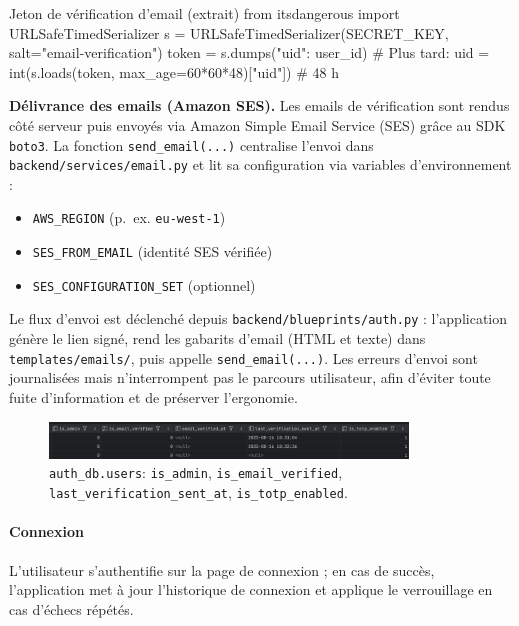 \begin{codebox}[language=Python]{Jeton de vérification d'email (extrait)}
from itsdangerous import URLSafeTimedSerializer
s = URLSafeTimedSerializer(SECRET_KEY, salt="email-verification")
token = s.dumps({"uid": user_id})
# Plus tard:  uid = int(s.loads(token, max_age=60*60*48)["uid"])  # 48 h
\end{codebox}

\noindent\textbf{Délivrance des emails (Amazon SES).} Les emails de vérification sont rendus côté serveur puis envoyés via Amazon Simple Email Service (SES) grâce au SDK \texttt{boto3}. La fonction \texttt{send\_email(...)} centralise l'envoi dans \texttt{backend/services/email.py} et lit sa configuration via variables d'environnement :
\begin{itemize}
  \item \texttt{AWS\_REGION} (p.~ex. \texttt{eu-west-1})
  \item \texttt{SES\_FROM\_EMAIL} (identité SES vérifiée)
  \item \texttt{SES\_CONFIGURATION\_SET} (optionnel)
\end{itemize}
Le flux d'envoi est déclenché depuis \texttt{backend/blueprints/auth.py} : l'application génère le lien signé, rend les gabarits d'email (HTML et texte) dans \texttt{templates/emails/}, puis appelle \texttt{send\_email(...)}. Les erreurs d'envoi sont journalisées mais n'interrompent pas le parcours utilisateur, afin d'éviter toute fuite d'information et de préserver l'ergonomie.

\begin{figure}[H]
  \centering
  \includegraphics[width=0.85\textwidth]{../figures/chap10/auth_db2.png}
  \caption[users — champs statut]{\texttt{auth\_db.users}: \texttt{is\_admin}, \texttt{is\_email\_verified}, \texttt{last\_verification\_sent\_at}, \texttt{is\_totp\_enabled}.}
\end{figure}

\paragraph{Connexion}
L'utilisateur s'authentifie sur la page de connexion ; en cas de succès, l'application met à jour l'historique de connexion et applique le verrouillage en cas d'échecs répétés.

